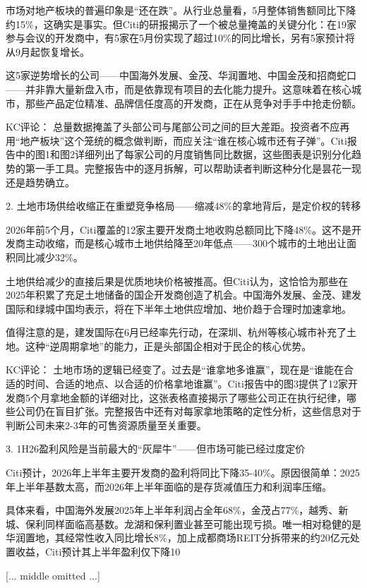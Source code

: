 \documentclass[11pt]{ctexart}
\begin{document}
市场对地产板块的普遍印象是“还在跌”。从行业总量看，5月整体销售额同比下降约15\%，这确实是事实。但Citi的研报揭示了一个被总量掩盖的关键分化：在19家参与会议的开发商中，有5家在5月份实现了超过10\%的同比增长，另有5家预计将从9月起恢复增长。

这5家逆势增长的公司——中国海外发展、金茂、华润置地、中国金茂和招商蛇口——并非靠大量新盘入市，而是依靠现有项目的去化能力提升。这意味着在核心城市，那些产品定位精准、品牌信任度高的开发商，正在从竞争对手手中抢走份额。

KC评论： 总量数据掩盖了头部公司与尾部公司之间的巨大差距。投资者不应再用“地产板块”这个笼统的概念做判断，而应关注“谁在核心城市还有子弹”。Citi报告中的图1和图2详细列出了每家公司的月度销售同比数据，这些图表是识别分化趋势的第一手工具。完整报告中的逐月拆解，可以帮助读者判断这种分化是昙花一现还是趋势确立。

2. 土地市场供给收缩正在重塑竞争格局——缩减48\%的拿地背后，是定价权的转移

2026年前5个月，Citi覆盖的12家主要开发商土地收购总额同比下降48\%。这不是开发商主动收缩，而是核心城市土地供给降至20年低点——300个城市的土地出让面积同比减少32\%。

土地供给减少的直接后果是优质地块价格被推高。但Citi认为，这恰恰为那些在2025年积累了充足土地储备的国企开发商创造了机会。中国海外发展、金茂、建发国际和绿城中国均表示，将在下半年土地供应增加、地价趋于合理时加速拿地。

值得注意的是，建发国际在6月已经率先行动，在深圳、杭州等核心城市补充了土地。这种“逆周期拿地”的能力，正是头部国企相对于民企的核心优势。

KC评论： 土地市场的逻辑已经变了。过去是“谁拿地多谁赢”，现在是“谁能在合适的时间、合适的地点、以合适的价格拿地谁赢”。Citi报告中的图3提供了12家开发商5个月拿地金额的详细对比，这张表格直接揭示了哪些公司正在执行纪律，哪些公司仍在盲目扩张。完整报告中还有对每家拿地策略的定性分析，这些信息对于判断公司未来2-3年的可售资源质量至关重要。

3. 1H26盈利风险是当前最大的“灰犀牛”——但市场可能已经过度定价

Citi预计，2026年上半年主要开发商的盈利将同比下降35-40\%。原因很简单：2025年上半年基数太高，而2026年上半年面临的是存货减值压力和利润率压缩。

具体来看，中国海外发展2025年上半年利润占全年68\%，金茂占77\%，越秀、新城、保利同样面临高基数。龙湖和保利置业甚至可能出现亏损。唯一相对稳健的是华润置地，其经常性收入同比增长8\%，加上成都商场REIT分拆带来的约20亿元处置收益，Citi预计其上半年盈利仅下降10

[... middle omitted ...]
\end{document}
